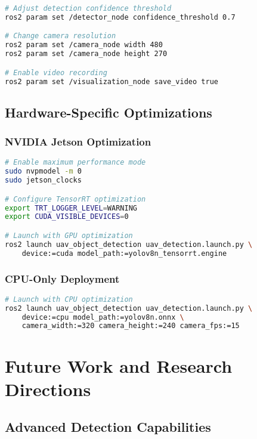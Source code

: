 \documentclass[11pt,a4paper]{article}
\begin{document}
\begin{lstlisting}[language=bash, caption=Runtime Parameter Modification]
# Adjust detection confidence threshold
ros2 param set /detector_node confidence_threshold 0.7

# Change camera resolution
ros2 param set /camera_node width 480
ros2 param set /camera_node height 270

# Enable video recording
ros2 param set /visualization_node save_video true
\end{lstlisting}

\subsection{Hardware-Specific Optimizations}

\subsubsection{NVIDIA Jetson Optimization}

\begin{lstlisting}[language=bash, caption=Jetson-Specific Configuration]
# Enable maximum performance mode
sudo nvpmodel -m 0
sudo jetson_clocks

# Configure TensorRT optimization
export TRT_LOGGER_LEVEL=WARNING
export CUDA_VISIBLE_DEVICES=0

# Launch with GPU optimization
ros2 launch uav_object_detection uav_detection.launch.py \
    device:=cuda model_path:=yolov8n_tensorrt.engine
\end{lstlisting}

\subsubsection{CPU-Only Deployment}

\begin{lstlisting}[language=bash, caption=CPU-Only Configuration]
# Launch with CPU optimization
ros2 launch uav_object_detection uav_detection.launch.py \
    device:=cpu model_path:=yolov8n.onnx \
    camera_width:=320 camera_height:=240 camera_fps:=15
\end{lstlisting}

\section{Future Work and Research Directions}

\subsection{Advanced Detection Capabilities}
\end{document}
